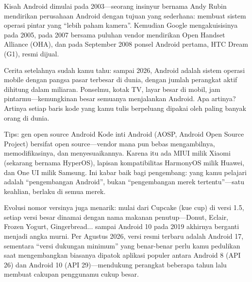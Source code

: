 


Kisah Android dimulai pada 2003—seorang insinyur bernama Andy Rubin mendirikan perusahaan Android dengan tujuan yang sederhana: membuat sistem operasi pintar yang “lebih paham kamera”. Kemudian Google mengakuisisinya pada 2005, pada 2007 bersama puluhan vendor mendirikan Open Handset Alliance (OHA), dan pada September 2008 ponsel Android pertama, HTC Dream (G1), resmi dijual.

Cerita setelahnya sudah kamu tahu: sampai 2026, Android adalah sistem operasi mobile dengan pangsa pasar terbesar di dunia, dengan jumlah perangkat aktif dihitung dalam miliaran. Ponselmu, kotak TV, layar besar di mobil, jam pintarmu—kemungkinan besar semuanya menjalankan Android. Apa artinya? Artinya setiap baris kode yang kamu tulis berpeluang dipakai oleh paling banyak orang di dunia.

\begin{tcbinfo}{Tips: gen open source Android}
Kode inti Android (AOSP, Android Open Source Project) bersifat open source—vendor mana pun bebas mengambilnya, memodifikasinya, dan menyesuaikannya. Karena itu ada MIUI milik Xiaomi (sekarang bernama HyperOS), lapisan kompatibilitas HarmonyOS milik Huawei, dan One UI milik Samsung. Ini kabar baik bagi pengembang: yang kamu pelajari adalah “pengembangan Android”, bukan “pengembangan merek tertentu”—satu keahlian, berlaku di semua merek.

\end{tcbinfo}

Evolusi nomor versinya juga menarik: mulai dari Cupcake (kue cup) di versi 1.5, setiap versi besar dinamai dengan nama makanan penutup—Donut, Eclair, Frozen Yogurt, Gingerbread... sampai Android 10 pada 2019 akhirnya berganti menjadi angka murni. Per Agustus 2026, versi resmi terbaru adalah Android 17, sementara “versi dukungan minimum” yang benar-benar perlu kamu pedulikan saat mengembangkan biasanya dipatok aplikasi populer antara Android 8 (API 26) dan Android 10 (API 29)—mendukung perangkat beberapa tahun lalu membuat cakupan penggunamu cukup besar.

